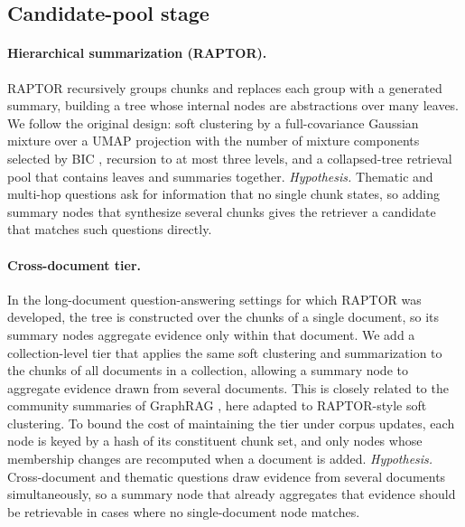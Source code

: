 \documentclass[10pt,twocolumn]{article}
\begin{document}
\subsection{Candidate-pool stage}
\paragraph{Hierarchical summarization (RAPTOR).}
RAPTOR \cite{sarthi2024raptor} recursively groups chunks and replaces each group
with a generated summary, building a tree whose internal nodes are abstractions
over many leaves. We follow the original design: soft clustering by a
full-covariance Gaussian mixture over a UMAP projection
\cite{mcinnes2018umap} with the number of mixture components selected by BIC
\cite{schwarz1978bic}, recursion to at most three levels, and a collapsed-tree
retrieval pool that contains leaves and summaries together.
\emph{Hypothesis.} Thematic and multi-hop questions ask for information that no
single chunk states, so adding summary nodes that synthesize several chunks gives
the retriever a candidate that matches such questions directly.

\paragraph{Cross-document tier.}
In the long-document question-answering settings for which RAPTOR was developed,
the tree is constructed over the chunks of a single document, so its summary
nodes aggregate evidence only within that document. We add a collection-level
tier that applies the same soft clustering and summarization to the chunks of all
documents in a collection, allowing a summary node to aggregate evidence drawn
from several documents. This is closely related to the community summaries of
GraphRAG \cite{edge2024graphrag}, here adapted to RAPTOR-style soft clustering. To
bound the cost of maintaining the tier under corpus updates, each node is keyed by
a hash of its constituent chunk set, and only nodes whose membership changes are
recomputed when a document is added.
\emph{Hypothesis.} Cross-document and thematic questions draw evidence from
several documents simultaneously, so a summary node that already aggregates that
evidence should be retrievable in cases where no single-document node matches.
\end{document}
